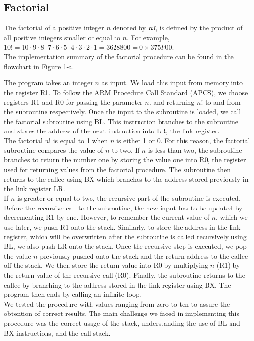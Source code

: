 \documentclass[10pt]{article}
\begin{document}
\subsection{Factorial}
The factorial of a positive integer $n$ denoted by \textbf{\textit{n!}}, is defined by the product of all positive integers smaller or equal to $n$. For example, $10! = 10 \cdot 9 \cdot 8 \cdot 7 \cdot 6 \cdot 5 \cdot 4 \cdot 3 \cdot 2 \cdot 1 = 3628800 = 0\times375F00$.\\
The implementation summary of the factorial procedure can be found in the flowchart in Figure 1-a.

The program takes an integer $n$ as input. We load this input from memory into the register R1. To follow the ARM Procedure Call Standard (APCS), we choose registers R1 and R0 for passing the parameter $n$, and returning $n!$ to and from the subroutine respectively. Once the input to the subroutine is loaded, we call the factorial subroutine using BL. This instruction branches to the subroutine and stores the address of the next instruction into LR, the link register.\\
The factorial $n!$ is equal to 1 when $n$ is either 1 or 0. For this reason, the factorial subroutine compares the value of $n$ to two. If $n$ is less than two, the subroutine branches to return the number one by storing the value one into R0, the register used for returning values from the factorial procedure. The subroutine then returns to the callee using BX which branches to the address stored previously in the link register LR.\\
If $n$ is greater or equal to two, the recursive part of the subroutine is executed. Before the recursive call to the subroutine, the new input has to be updated by decrementing R1 by one. However, to remember the current value of $n$, which we use later, we push R1 onto the stack. Similarly, to store the address in the link register, which will be overwritten after the subroutine is called recursively using BL, we also push LR onto the stack. Once the recursive step is executed, we pop the value $n$ previously pushed onto the stack and the return address to the callee off the stack. We then store the return value into R0 by multiplying $n$ (R1) by the return value of the recursive call (R0). Finally, the subroutine returns to the callee by branching to the address stored in the link register using BX.
The program then ends by calling an infinite loop. \\

We tested the procedure with values ranging from zero to ten to assure the obtention of correct results. The main challenge we faced in implementing this procedure was the correct usage of the stack, understanding the use of BL and BX instructions, and the call stack.
\end{document}
